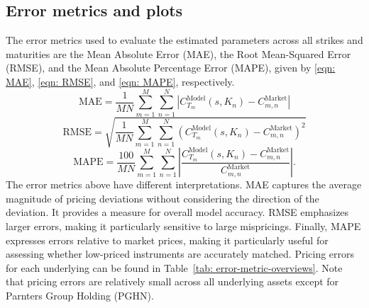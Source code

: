 \subsection{Error metrics and plots}
The error metrics used to evaluate the estimated parameters across all strikes and maturities are the Mean Absolute Error (MAE), the Root Mean-Squared Error (RMSE), and the Mean Absolute Percentage Error (MAPE), given by \eqref{eqn: MAE}, \eqref{eqn: RMSE}, and \eqref{eqn: MAPE}, respectively. 
\begin{equation}
    \text{MAE} = \frac{1}{MN} \sum_{m=1}^M\sum_{n=1}^N \left| C_{T_m}^{\text{Model}}(s,K_n) - C_{m,n}^{\text{Market}} \right|
    \label{eqn: MAE}
\end{equation}
\begin{equation}
    \text{RMSE} = \sqrt{\frac{1}{MN} \sum_{m=1}^M\sum_{n=1}^N \left(C_{T_m}^{\text{Model}}(s,K_n) - C_{m,n}^{\text{Market}}\right)^2}
    \label{eqn: RMSE}
\end{equation}
\begin{equation}
    \text{MAPE} = \frac{100}{MN} \sum_{m=1}^M\sum_{n=1}^N \left| \frac{C_{T_m}^{\text{Model}}(s,K_n) - C_{m,n}^{\text{Market}}}{C_{m,n}^{\text{Market}}} \right|.
    \label{eqn: MAPE}
\end{equation}
The error metrics above have different interpretations. MAE captures the average magnitude of pricing deviations without considering the direction of the deviation. It provides a measure for overall model accuracy. RMSE emphasizes larger errors, making it particularly sensitive to large mispricings. Finally, MAPE expresses errors relative to market prices, making it particularly useful for assessing whether low-priced instruments are accurately matched. Pricing errors for each underlying can be found in Table~\ref{tab: error-metric-overviews}. Note that pricing errors are relatively small across all underlying assets except for Parnters Group Holding (PGHN).

\begingroup
\scriptsize
\renewcommand{\arraystretch}{0.98}
\setlength{\tabcolsep}{3pt}

\newcommand{\errormetricblock}[4]{%
    \begin{minipage}[t]{\linewidth}
        \vspace{0pt}
        \begin{tabular*}{\linewidth}{@{\extracolsep{\fill}}lr@{}}
            \toprule
            \multicolumn{2}{c}{\textbf{#1}} \\
            \midrule
            Metric & Value \\
            \midrule
            MAE & $#2$ \\
            RMSE & $#3$ \\
            MAPE (\%) & $#4$ \\
            \bottomrule
        \end{tabular*}
    \end{minipage}%
}

